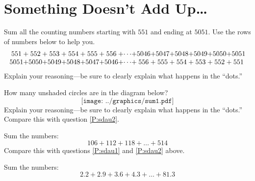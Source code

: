 \newpage
\section{Something Doesn't Add Up\dots}\label{A:doesntAddUp}


\begin{prob}\label{P:sdau2}
Sum all the counting numbers starting with $551$ and ending at
$5051$. Use the rows of numbers below to help you.
\[
\begin{array}{c@{ + }c@{ + }c@{ + }c@{ + }c@{ + }c@{ + }c@{ + }c@{ + }c@{ + }c@{ + }c@{ + }c@{ + }c}
551 & 552 & 553 & 554 & 555 & 556 & \cdots & 5046 & 5047 & 5048 & 5049 & 5050 & 5051 \\
5051 & 5050 & 5049 & 5048 & 5047 & 5046 & \cdots & 556 & 555 & 554 & 553 & 552 & 551 
\end{array}
\]
Explain your reasoning---be sure to clearly explain what happens in
the ``dots.''  
\end{prob}


\begin{prob}\label{P:sdau1}
How many unshaded circles are in the diagram below? 
\[
\texttt{[image: ../graphics/sum1.pdf]}
\]
Explain your reasoning---be sure to clearly explain what happens in
the ``dots.'' Compare this with question \ref{P:sdau2}.
\end{prob}



\begin{prob}
Sum the numbers:  
\[
106 + 112 + 118 + \dots + 514
\]
Compare this with questions \ref{P:sdau1} and \ref{P:sdau2} above.
\end{prob}

\begin{prob}
Sum the numbers:
\[
2.2 + 2.9 + 3.6 + 4.3 + \dots + 81.3
\]
\end{prob}


